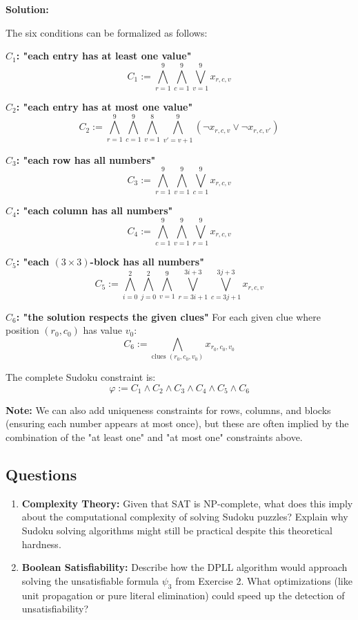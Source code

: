 \documentclass{article}
\begin{document}
\textbf{Solution:}

The six conditions can be formalized as follows:

\textbf{$C_1$: "each entry has at least one value"}
$$C_1 := \bigwedge_{r=1}^9 \bigwedge_{c=1}^9 \bigvee_{v=1}^9 x_{r,c,v}$$

\textbf{$C_2$: "each entry has at most one value"}
$$C_2 := \bigwedge_{r=1}^9 \bigwedge_{c=1}^9 \bigwedge_{v=1}^8 \bigwedge_{v'=v+1}^9 (\neg x_{r,c,v} \lor \neg x_{r,c,v'})$$

\textbf{$C_3$: "each row has all numbers"}
$$C_3 := \bigwedge_{r=1}^9 \bigwedge_{v=1}^9 \bigvee_{c=1}^9 x_{r,c,v}$$

\textbf{$C_4$: "each column has all numbers"}
$$C_4 := \bigwedge_{c=1}^9 \bigwedge_{v=1}^9 \bigvee_{r=1}^9 x_{r,c,v}$$

\textbf{$C_5$: "each $(3 \times 3)$-block has all numbers"}
$$C_5 := \bigwedge_{i=0}^2 \bigwedge_{j=0}^2 \bigwedge_{v=1}^9 \bigvee_{r=3i+1}^{3i+3} \bigvee_{c=3j+1}^{3j+3} x_{r,c,v}$$

\textbf{$C_6$: "the solution respects the given clues"}
For each given clue where position $(r_0, c_0)$ has value $v_0$:
$$C_6 := \bigwedge_{\text{clues } (r_0,c_0,v_0)} x_{r_0,c_0,v_0}$$

The complete Sudoku constraint is:
$$\varphi := C_1 \land C_2 \land C_3 \land C_4 \land C_5 \land C_6$$

\textbf{Note:} We can also add uniqueness constraints for rows, columns, and blocks (ensuring each number appears at most once), but these are often implied by the combination of the "at least one" and "at most one" constraints above.

\subsection{Questions}

\begin{enumerate}
    \item \textbf{Complexity Theory:} Given that SAT is NP-complete, what does this imply about the computational complexity of solving Sudoku puzzles? Explain why Sudoku solving algorithms might still be practical despite this theoretical hardness.
    
    \item \textbf{Boolean Satisfiability:} Describe how the DPLL algorithm would approach solving the unsatisfiable formula $\psi_3$ from Exercise 2. What optimizations (like unit propagation or pure literal elimination) could speed up the detection of unsatisfiability?
\end{enumerate}
\end{document}
